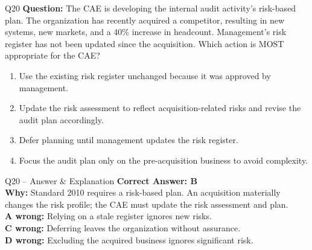 \documentclass[aspectratio=169,10pt]{beamer}
\begin{document}
	\begin{frame}[t]{Q20}
		\small
		\textbf{Question:} The CAE is developing the internal audit activity's risk-based plan. The organization has recently acquired a competitor, resulting in new systems, new markets, and a 40\% increase in headcount. Management's risk register has not been updated since the acquisition. Which action is MOST appropriate for the CAE?
		\begin{enumerate}[label=\Alph*.,itemsep=1pt,topsep=2pt]
			\item Use the existing risk register unchanged because it was approved by management.
			\item Update the risk assessment to reflect acquisition-related risks and revise the audit plan accordingly.
			\item Defer planning until management updates the risk register.
			\item Focus the audit plan only on the pre-acquisition business to avoid complexity.
		\end{enumerate}
	\end{frame}
	
	\begin{frame}[t]{Q20 -- Answer \& Explanation}
		\small
		\textbf{Correct Answer: B} \\[4pt]
		\textbf{Why:} Standard 2010 requires a risk-based plan. An acquisition materially changes the risk profile; the CAE must update the risk assessment and plan. \\[4pt]
		\textbf{A wrong:} Relying on a stale register ignores new risks. \\[2pt]
		\textbf{C wrong:} Deferring leaves the organization without assurance. \\[2pt]
		\textbf{D wrong:} Excluding the acquired business ignores significant risk.
	\end{frame}
	
\end{document}
